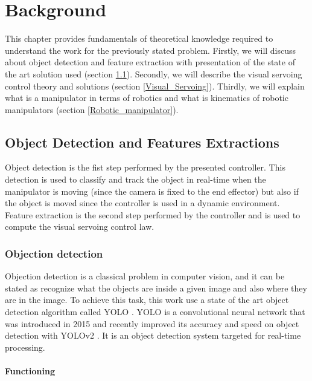 
\chapter{Background}
\label{chapter:Background}

This chapter provides fundamentals of theoretical knowledge required to understand the work for the previously stated problem. Firstly, we will discuss about object detection and feature extraction with presentation of the state of the art solution used (section \ref{Object_detection}). Secondly, we will describe the visual servoing control theory and solutions (section \ref{Visual_Servoing}). Thirdly, we will explain what is a manipulator in terms of robotics and what is kinematics of robotic manipulators (section \ref{Robotic_manipulator}).

\section{Object Detection and Features Extractions}
\label{Object_detection}

Object detection is the fist step performed by the presented controller. This detection is used to classify and track the object in real-time when the manipulator is moving (since the camera is fixed to the end effector) but also if the object is moved since the controller is used in a dynamic environment. Feature extraction is the second step performed by the controller and is used to compute the visual servoing control law.

\subsection{Objection detection}

Objection detection is a classical problem in computer vision, and it can be stated as recognize what the objects are inside a given image and also where they are in the image. To achieve this task, this work use a state of the art object detection algorithm called \gls{YOLO} \cite{DBLP:journals/corr/RedmonDGF15}.
\gls{YOLO} is a convolutional neural network that was introduced in 2015 and recently improved its accuracy and speed on object detection with YOLOv2 \cite{DBLP:journals/corr/RedmonF16}. It is an object detection system targeted for real-time processing. 

\subsubsection{Functioning}

